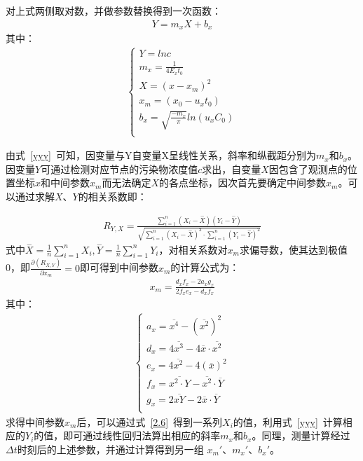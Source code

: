 \documentclass{whutmod}
\begin{document}
	对上式两侧取对数，并做参数替换得到一次函数：
	\begin{gather}
	Y=m_{x}X+b_{x}\label{yyy}
	\end{gather}
	其中：
	\begin{gather*}
		\left\{\begin{matrix}
			Y=lnc	\\
		m_{x}=\frac{1}{4E_{x}t_{0}} \\
		X=(x-x_{m})^{2} \\
		x_{m}=(x_{0}-u_{x}t_{0}) \\
		b_{x}=\sqrt{\frac{-m_{x}}{\pi}}ln(u_{x}C_{0})\\
		\end{matrix}\right.
	\end{gather*}
	
	由式~\ref{yyy}~可知，因变量与Y自变量X呈线性关系，斜率和纵截距分别为$m_{x}$和$b_{x}$。因变量$Y$可通过检测对应节点的污染物浓度值$c$求出，自变量$X$因包含了观测点的位置坐标$x$和中间参数$ x_{m}$而无法确定$X$的各点坐标，因次首先要确定中间参数$ x_{m}$。可以通过求解$X$、$Y$的相关系数\parencite{沈凤文2016点源污染的移动式检测定位及应用}即：
	
	\begin{gather*}
		R_{Y,X}=\frac{\sum_{i=1}^{n}(X_{i}-\overset{-}{X})(Y_{i}-\overset{-}{Y})}{\sqrt{\sum_{i=1}^{n}(X_{i}-\overset{-}{X})^{2}\cdot \sum_{i=1}^{n}(Y_{i}-\overset{-}{Y})^{2}}}
	\end{gather*}
	式中$\overset{-}{X}=\frac{1}{n}\sum_{i=1}^{n}X_{i},
	\overset{-}{Y}=\frac{1}{n}\sum_{i=1}^{n}Y_{i}
	$，对相关系数对$x_{m}$求偏导数，使其达到极值0，即$\frac{\partial(R_{X,Y}) }{\partial x_{m}}=0$即可得到中间参数$x_{m}$的计算公式为：
		\begin{gather}
x_{m}=\frac{d_{x}f_{x}-2a_{x}g_{x}}{2f_{x}e_{x}-d_{x}f_{x}}\label{2.6}
	\end{gather}
	其中：
		\begin{gather*}
	\left\{\begin{matrix}
a_{x}=\overline {x^{4}}-(\overline {x^{2}})^{2}	\\
	d_{x}=4\overline {x^{3}}-4\overline {x}\cdot\overline {x^{2}}\\
	e_{x}=4\overline{x^{2}}-4(\overline{x})^{2} \\
	f_{x}=\overline{x^{2}\cdot Y}-\overline{x^{2}}\cdot \overline{Y}\\
	g_{x}=2\overline{xY}-2\overline{x}\cdot \overline{Y}\\
	\end{matrix}\right.
	\end{gather*}
	求得中间参数$x_{m}$后，可以通过式~\ref{2.6}~得到一系列$X_{i}$的值，利用式~\ref{yyy}~计算相应的$Y_{i}$的值，即可通过线性回归法算出相应的斜率$m_{x}$和$b_{x}$。同理，测量计算经过$\Delta t$时刻后的上述参数，并通过计算得到另一组 ${x_{m}}'$、${m_{x}}'$、${b_{x}}'$。
	
\end{document}
